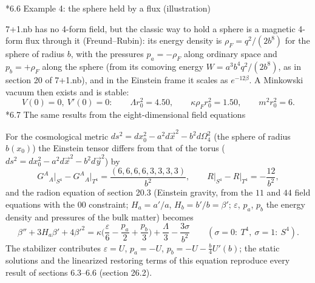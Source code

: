 \documentclass[10pt,a4paper]{article}
\makeatletter
\renewcommand\subsection{\@startsection{subsection}{2}{\z@}{-3.25ex\@plus -1ex \@minus -.2ex}{1.5ex \@plus .2ex}{\normalfont\large\bfseries\raggedright}}
\makeatother
\begin{document}
\subsection*{6.6 Example 4: the sphere held by a flux (illustration)}
7+1.nb has no 4-form field, but the classic way to hold a sphere is a magnetic 4-form flux through it (Freund–Rubin): its energy density is $\rho_F=q^2/(2b^8)$ for the sphere of radius $b$, with the pressures $p_a=-\rho_F$ along ordinary space and $p_b=+\rho_F$ along the sphere (from its comoving energy $W=a^3b^4q^2/(2b^8)$, as in section 20 of 7+1.nb), and in the Einstein frame it scales as $e^{-12\beta}$. A Minkowski vacuum then exists and is stable:
\begin{equation*}
V(0)=0,\ V'(0)=0:\qquad \Lambda r_0^2=4.50,\qquad \kappa\rho_Fr_0^2=1.50,\qquad m^2r_0^2=6 .
\end{equation*}
\subsection*{6.7 The same results from the eight-dimensional field equations}
For the cosmological metric $ds^2=dx_0^2-a^2d\vec x^2-b^2d\Omega_4^2$ (the sphere of radius $b(x_0)$) the Einstein tensor differs from that of the torus ($ds^2=dx_0^2-a^2d\vec x^2-b^2d\vec y^2$) by
\begin{equation*}
G^A{}_A\big|_{S^4}-G^A{}_A\big|_{T^4}=\frac{(6,6,6,6,3,3,3,3)}{b^2},\qquad R\big|_{S^4}-R\big|_{T^4}=-\frac{12}{b^2},
\end{equation*}
and the radion equation of section 20.3 (Einstein gravity, from the $11$ and $44$ field equations with the $00$ constraint; $H_a=a'/a$, $H_b=b'/b=\beta'$; $\varepsilon$, $p_a$, $p_b$ the energy density and pressures of the bulk matter) becomes
\begin{equation*}
\beta''+3H_a\beta'+4\beta'^2=\kappa\Big(\frac\varepsilon6-\frac{p_a}2+\frac{p_b}3\Big)+\frac\Lambda3-\frac{3\sigma}{b^2}\qquad(\sigma=0:\ T^4,\ \sigma=1:\ S^4).
\end{equation*}
The stabilizer contributes $\varepsilon=U$, $p_a=-U$, $p_b=-U-\frac b4U'(b)$; the static solutions and the linearized restoring terms of this equation reproduce every result of sections 6.3–6.6 (section 26.2).
\end{document}
